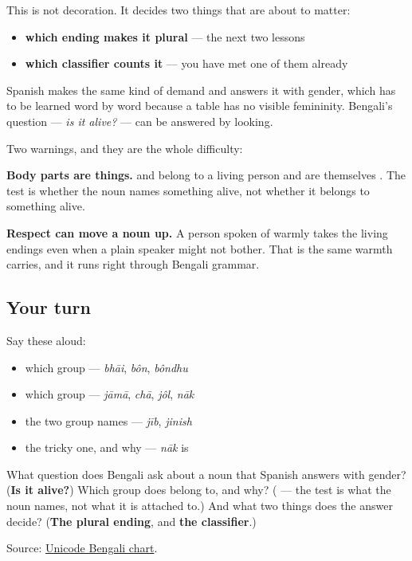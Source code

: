 This is not decoration. It decides two things that are about to matter:

\begin{itemize}
\raggedright
  \item \textbf{which ending makes it plural} — the next two lessons
  \item \textbf{which classifier counts it} — you have met one of them already
\end{itemize}

Spanish makes the same kind of demand and answers it with gender, which has to be learned word by word because a table has no visible femininity. Bengali's question — \emph{is it alive?} — can be answered by looking.

\begin{grammarlens}[title={Grammar Lens: the borderline, and what to do about it}]
Two warnings, and they are the whole difficulty:

\textbf{Body parts are things.} \textbf{} and \textbf{} belong to a living person and are themselves \textbf{}. The test is whether the noun names something alive, not whether it belongs to something alive.

\textbf{Respect can move a noun up.} A person spoken of warmly takes the living endings even when a plain speaker might not bother. That is the same warmth \textbf{} carries, and it runs right through Bengali grammar.
\end{grammarlens}

\subsection*{Your turn}
Say these aloud:

\begin{itemize}
\raggedright
  \item which group — \emph{bhāi}, \emph{bôn}, \emph{bôndhu}
  \item which group — \emph{jāmā}, \emph{chā}, \emph{jôl}, \emph{nāk}
  \item the two group names — \emph{jīb}, \emph{jinish}
  \item the tricky one, and why — \emph{nāk} is \textbf{}
\end{itemize}

\begin{tcolorbox}[breakable,colback=teal!4,colframe=teal!35!black,title={Before you move on}]
What question does Bengali ask about a noun that Spanish answers with gender? (\textbf{Is it alive?}) Which group does \textbf{} belong to, and why? (\textbf{} — the test is what the noun names, not what it is attached to.) And what two things does the answer decide? (\textbf{The plural ending}, and \textbf{the classifier}.)

Source: \href{https://www.unicode.org/charts/PDF/U0980.pdf}{Unicode Bengali chart}.
\end{tcolorbox}
